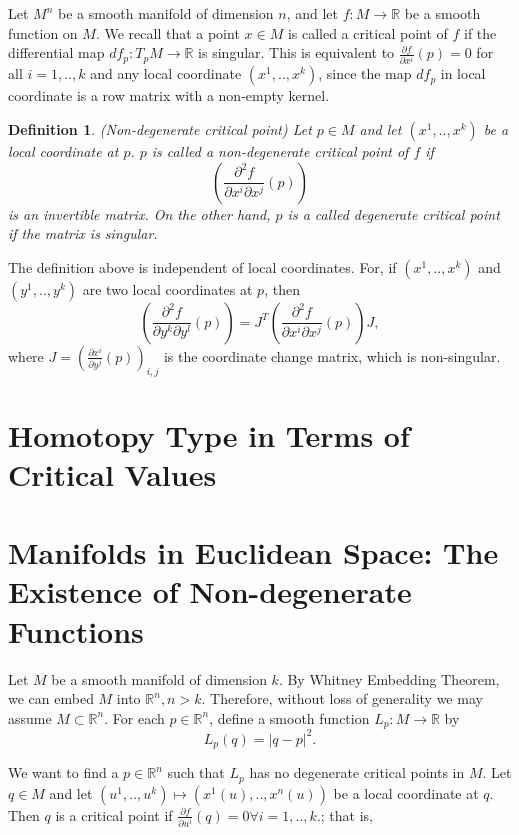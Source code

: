 \documentclass[12pt]{article}
\newtheorem{defn}[thm]{Definition}
\newcommand{\RR}{\mathbb{R}}      %
\begin{document}
Let $M^n$ be a smooth manifold of dimension $n$, and let $f: M \to \RR$ be a
smooth function on $M$. We recall that a point $x \in M$ is called a critical
point of $f$ if the differential map $ df_p : T_pM \to \RR $ is singular. This
is equivalent to $\frac{\partial f}{\partial x^i} (p) = 0$ for all $i = 1,
.. ,k$ and any local coordinate $(x^1, .., x^k)$, since the map $df_p$ in local
coordinate is a row matrix with a non-empty kernel.

\begin{defn}
  (Non-degenerate critical point) Let $p \in M$ and let $(x^1, .., x^k)$ be a
  local coordinate at $p$. $p$ is called a non-degenerate critical point of $f$
  if
  \begin{equation}
    \left( \frac{\partial^2 f}{\partial x^i \partial x^j} (p) \right)
  \end{equation}
  is an invertible matrix. On the other hand, $p$ is a called degenerate
  critical point if the matrix is singular.
\end{defn}

The definition above is independent of local coordinates. For, if $(x^1, ..,
x^k)$ and $(y^1, .., y^k)$ are two local coordinates at $p$, then
\begin{equation}
      \left( \frac{\partial^2 f}{\partial y^k \partial y^l} (p) \right) =
      J^T\left( \frac{\partial^2 f}{\partial x^i \partial x^j} (p) \right)J,
\end{equation}
where $J = \left( \frac{\partial x^i}{\partial y^j}(p) \right)_{i,j}$ is the
coordinate change matrix, which is non-singular.

\section{Homotopy Type in Terms of Critical Values}


\section{Manifolds in Euclidean Space: The Existence of Non-degenerate
  Functions}
Let $M$ be a smooth manifold of dimension $k$. By Whitney Embedding Theorem, we
can embed $M$ into $\RR^n, n > k$. Therefore, without loss of generality we may
assume $M \subset \RR^n$. For each $p \in \RR^n$, define a smooth function $L_p
: M \to \RR $ by
\begin{equation}
  L_p(q) = |q-p|^2.
\end{equation}

We want to find a $p \in \RR^n$ such that $L_p$ has no degenerate critical
points in $M$. Let $q \in M$ and let $(u^1, .., u^k) \mapsto (x^1(u), ..,
x^n(u))$ be a local coordinate at $q$. Then $q$ is a critical point if
$\frac{\partial f}{\partial u^i}(q) = 0 \forall i = 1, .., k.$; that is,
\end{document}
